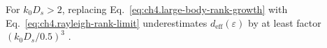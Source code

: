\begin{corollary}
\label{cor:ch4.no-dipole-extrap}
For \(k_{0}D_{s}>2\), replacing Eq.~\eqref{eq:ch4.large-body-rank-growth} with Eq.~\eqref{eq:ch4.rayleigh-rank-limit} underestimates
\(d_{\mathrm{eff}}(\varepsilon)\) by at least factor \((k_{0}D_{s}/0.5)^{3}\) \cite{jackson1999,hansen1988,stratton1941,harrington2001}.
\end{corollary}
